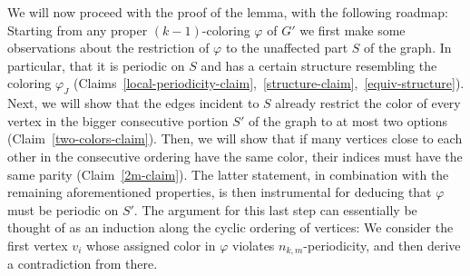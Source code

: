 \documentclass[a4paper,10pt,hidelinks]{amsart}
\renewcommand{\phi}{\ensuremath{\varphi}}
\theoremstyle{definition}
\begin{document}
We will now proceed with the proof of the lemma, with the following roadmap: Starting from any proper $(k-1)$-coloring $\varphi$ of $G'$ we first make some observations about the restriction of $\varphi$ to the unaffected part $S$ of the graph. In particular, that it is periodic on $S$ and has a certain structure resembling the coloring $\varphi_J$ (Claims~\ref{local-periodicity-claim},~\ref{structure-claim},~\ref{equiv-structure}). Next, we will show that the edges incident to $S$ already restrict the color of every vertex in the bigger consecutive portion $S'$ of the graph to at most two options (Claim~\ref{two-colors-claim}). Then, we will show that if many vertices close to each other in the consecutive ordering have the same color, their indices must have the same parity (Claim~\ref{2m-claim}). The latter statement, in combination with the remaining aforementioned properties, is then instrumental for deducing that $\varphi$ must be periodic on $S'$. The argument for this last step can essentially be thought of as an induction along the cyclic ordering of vertices: We consider the first vertex $v_i$ whose assigned color in $\phi$ violates $n_{k,m}$-periodicity, and then derive a contradiction from there.
\end{document}
